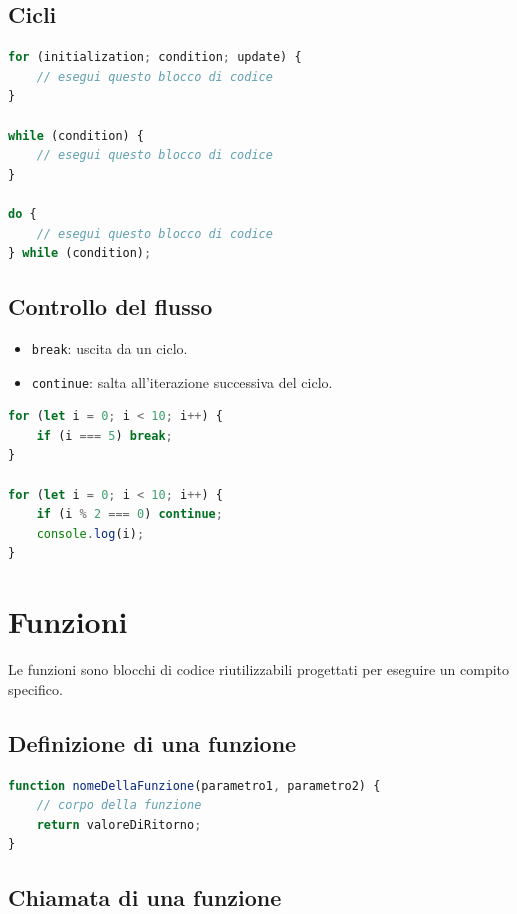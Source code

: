 \subsection{Cicli}

\begin{lstlisting}[language=JavaScript]
for (initialization; condition; update) {
    // esegui questo blocco di codice
}

while (condition) {
    // esegui questo blocco di codice
}

do {
    // esegui questo blocco di codice
} while (condition);
\end{lstlisting}

\subsection{Controllo del flusso}

\begin{itemize}
    \item \texttt{break}: uscita da un ciclo.
    \item \texttt{continue}: salta all'iterazione successiva del ciclo.
\end{itemize}

\begin{lstlisting}[language=JavaScript]
for (let i = 0; i < 10; i++) {
    if (i === 5) break;
}

for (let i = 0; i < 10; i++) {
    if (i % 2 === 0) continue;
    console.log(i);
}
\end{lstlisting}

\section{Funzioni}

Le funzioni sono blocchi di codice riutilizzabili progettati per eseguire un compito specifico.

\subsection{Definizione di una funzione}

\begin{lstlisting}[language=JavaScript]
function nomeDellaFunzione(parametro1, parametro2) {
    // corpo della funzione
    return valoreDiRitorno;
}
\end{lstlisting}

\subsection{Chiamata di una funzione}

